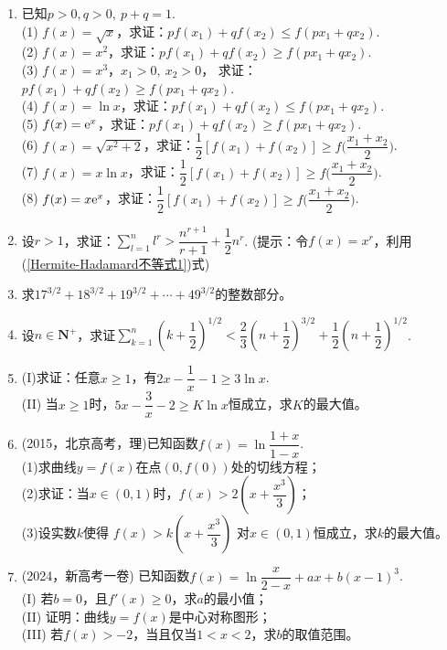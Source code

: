 \begin{enumerate}[label={\textbf{\thechapter.\arabic*}},leftmargin=
    \inteval{\myenumleftmargin}pt]
\item 已知$ p>0,q>0,\ p+q=1$. \\
(1) $f(x)=\sqrt{x} $，求证：$ pf(x_1)+qf(x_2)\leq f(px_1+qx_2) $. \\
(2) $f(x)=x^2 $，求证：$ pf(x_1)+qf(x_2)\geq f(px_1+qx_2) $. \\
(3) $f(x)=x^3 $，$ x_1>0,\ x_2>0 $，
求证：$ pf(x_1)+qf(x_2)\geq f(px_1+qx_2) $. \\
(4) $f(x)=\ln x $，求证：$ pf(x_1)+qf(x_2)\leq f(px_1+qx_2) $. \\
(5) $f(x)=\mathrm{e}^x $，求证：$ pf(x_1)+qf(x_2)\geq f(px_1+qx_2) $. \\
(6) $f(x)=\sqrt{x^2+2} $，求证：$ \dfrac{1}{2}[f(x_1)+f(x_2)]\geq 
f\Big(\dfrac{x_1+x_2}{2}\Big) $. \\
(7) $f(x)=x\ln x $，求证：$ \dfrac{1}{2}[f(x_1)+f(x_2)]\geq 
f\Big(\dfrac{x_1+x_2}{2}\Big) $. \\
(8) $f(x)=x\mathrm{e}^x $，求证：$ \dfrac{1}{2}[f(x_1)+f(x_2)]\geq 
f\Big(\dfrac{x_1+x_2}{2}\Big) $. 

\item 设$ r>1 $，求证：$ \sum\limits_{l=1}^n l^r>\dfrac{n^{r+1}}{r+1}+\dfrac{1}{2}n^r $.
(提示：令$ f(x)=x^r $，利用(\ref{Hermite-Hadamard不等式1})式) 

\item 求$ 17^{3/2}+18^{3/2}+19^{3/2}+\cdots + 49^{3/2} $的整数部分。

\item 设$n\in\textbf{N}^+$，求证$\sum\limits_{k=1}^{n}
\left(k+\dfrac{1}{2}\right)^{1/2}< \dfrac{2}{3}
\left(n+\dfrac{1}{2}\right)^{3/2}+\dfrac{1}{2}
\left(n+\dfrac{1}{2}\right)^{1/2} $. 

\item (I)求证：任意$ x\geq 1 $，有$ 2x-\dfrac{1}{x}-1\geq 3\ln x $.\\
(II) 当$ x\geq 1 $时，$ 5x-\dfrac{3}{x}-2\geq K\ln x $恒成立，求$ K $的最大值。

\item (2015，北京高考，理)已知函数$ f(x)=\ln\dfrac{1+x}{1-x} $.\\
(1)求曲线$ y=f(x) $在点$ (0,f(0)) $处的切线方程；\\
(2)求证：当$ x\in(0,1) $时，$ f(x)>2\left(x+\dfrac{x^{3}}{3}\right) $；\\
(3)设实数$ k $使得 $ f(x)>k\left(x+\dfrac{x^{3}}{3}\right) $
对$ x\in(0,1) $恒成立，求$ k $的最大值。

\item (2024，新高考一卷) 已知函数$f(x)=\ln \dfrac{x}{2-x}+ax+b(x-1)^3$. \\
(I)  若$b=0$，且$f'(x)\geq 0$，求$a$的最小值；\\
(II)  证明：曲线$y=f(x)$是中心对称图形；\\
(III)  若$f(x)>-2$，当且仅当$1<x<2$，求$b$的取值范围。


\end{enumerate}
